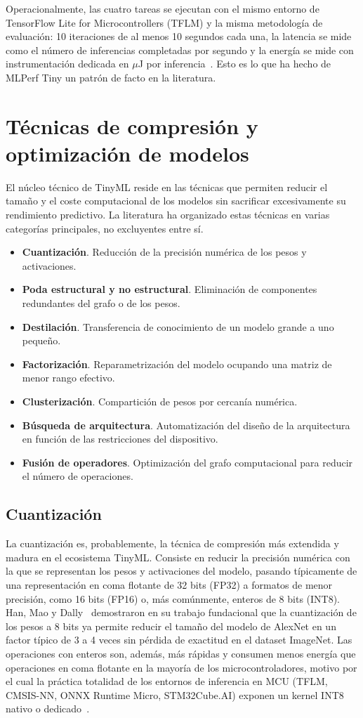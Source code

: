 \documentclass[a4paper,12pt,twoside,final]{book}
\begin{document}
Operacionalmente, las cuatro tareas se ejecutan con el mismo entorno de TensorFlow Lite for Microcontrollers (TFLM) y
la misma metodología de evaluación: 10 iteraciones de al menos 10 segundos cada una, la latencia se mide como el
número de inferencias completadas por segundo y la energía se mide con instrumentación dedicada en $\mu$J por
inferencia~\cite{bartoli2025ijcnn}. Esto es lo que ha hecho de MLPerf Tiny un patrón de facto en la literatura.

\section{Técnicas de compresión y optimización de modelos}
El núcleo técnico de TinyML reside en las técnicas que permiten reducir el tamaño y el coste computacional de los
modelos sin sacrificar excesivamente su rendimiento predictivo. La literatura ha organizado estas técnicas en
varias categorías principales, no excluyentes entre sí.
\begin{itemize}
  \item \textbf{Cuantización}. Reducción de la precisión numérica de los pesos y activaciones.
  \item \textbf{Poda estructural y no estructural}. Eliminación de componentes redundantes del grafo o de los pesos.
  \item \textbf{Destilación}. Transferencia de conocimiento de un modelo grande a uno pequeño.
  \item \textbf{Factorización}. Reparametrización del modelo ocupando una matriz de menor rango efectivo.
  \item \textbf{Clusterización}. Compartición de pesos por cercanía numérica.
  \item \textbf{Búsqueda de arquitectura}. Automatización del diseño de la arquitectura en función de las restricciones
  del dispositivo.
  \item \textbf{Fusión de operadores}. Optimización del grafo computacional para reducir el número de operaciones.
\end{itemize}

\subsection{Cuantización}
La cuantización es, probablemente, la técnica de compresión más extendida y madura en el ecosistema TinyML. Consiste
en reducir la precisión numérica con la que se representan los pesos y activaciones del modelo, pasando típicamente
de una representación en coma flotante de 32 bits (FP32) a formatos de menor precisión, como 16 bits (FP16) o, más
comúnmente, enteros de 8 bits (INT8). Han, Mao y Dally~\cite{han2015iclr} demostraron en su trabajo fundacional que
la cuantización de los pesos a 8 bits ya permite reducir el tamaño del modelo de AlexNet en un factor típico de 3 a
4 veces sin pérdida de exactitud en el dataset ImageNet. Las operaciones con enteros son, además, más rápidas y
consumen menos energía que operaciones en coma flotante en la mayoría de los microcontroladores, motivo por el cual
la práctica totalidad de los entornos de inferencia en MCU (TFLM, CMSIS-NN, ONNX Runtime Micro, STM32Cube.AI)
exponen un kernel INT8 nativo o dedicado~\cite{novac2021sensors,lê2025tist}.
\end{document}
